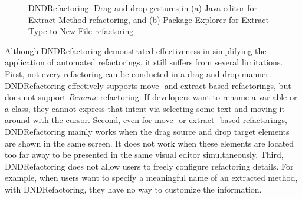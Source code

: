 \documentclass[runningheads,a4paper]{llncs}
\begin{document}
\begin{figure}
\centering
{}
\caption{DNDRefactoring: Drag-and-drop gestures in (a) Java editor for Extract Method refactoring, and (b) Package Explorer for Extract Type to New File refactoring~\cite{Lee:2013}.}
\label{fig:dnd}
\end{figure}

Although DNDRefactoring demonstrated effectiveness in simplifying the application of automated refactorings, it still suffers from several limitations. First, not every refactoring can be conducted in a drag-and-drop manner. DNDRefactoring effectively supports move- and extract-based refactorings, but does not support \emph{Rename} refactoring. If developers want to rename a variable or a class, they cannot express that intent via selecting some text and moving it around with the cursor. Second, even for move- or extract- based refactorings, DNDRefactoring mainly works when the drag source and drop target elements are shown in the same screen. It does not work when these elements are located too far away to be presented in the same visual editor simultaneously. Third, DNDRefactoring does not allow users to freely configure refactoring details. For example, when users want to specify a meaningful name of an extracted method, with DNDRefactoring, they have no way to customize the information.

\end{document}
